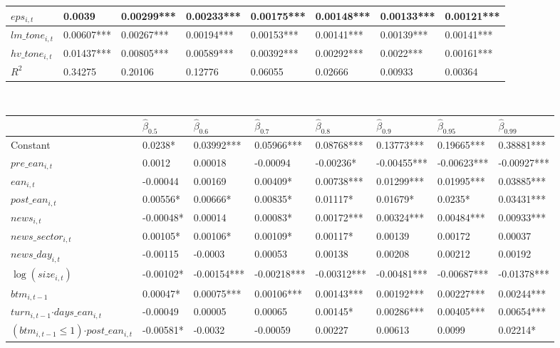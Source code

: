 \documentclass[]{article}
\begin{document}
\begin{small}
\begin{table}
\begin{tabular}[t]{l|l|l|l|l|l|l|l}
\hline
$eps_{i,t}$ & 0.0039 & 0.00299*** & 0.00233*** & 0.00175*** & 0.00148*** & 0.00133*** & 0.00121***\\
\hline
$lm\_tone_{i,t}$ & 0.00607*** & 0.00267*** & 0.00194*** & 0.00153*** & 0.00141*** & 0.00139*** & 0.00141***\\
\hline
$hv\_tone_{i,t}$  & 0.01437*** & 0.00805*** & 0.00589*** & 0.00392*** & 0.00292*** & 0.0022*** & 0.00161***\\
\hline
$R^2$ & 0.34275 & 0.20106 & 0.12776 & 0.06055 & 0.02666 & 0.00933 & 0.00364\\
\hline
\end{tabular}
\\
\centering
\begin{tabular}[t]{l|l|l|l|l|l|l|l}
\hline
  & $\hat\beta_{0.5}$ & $\hat\beta_{0.6}$ & $\hat\beta_{0.7}$ & $\hat\beta_{0.8}$ & $\hat\beta_{0.9}$ & $\hat\beta_{0.95}$ & $\hat\beta_{0.99}$\\
\hline
Constant & 0.0238* & 0.03992*** & 0.05966*** & 0.08768*** & 0.13773*** & 0.19665*** & 0.38881***\\
\hline
$pre\_ean_{i,t}$ & 0.0012 & 0.00018 & -0.00094 & -0.00236* & -0.00455*** & -0.00623*** & -0.00927***\\
\hline
$ean_{i,t}$ & -0.00044 & 0.00169 & 0.00409* & 0.00738*** & 0.01299*** & 0.01995*** & 0.03885***\\
\hline
$post\_ean_{i,t}$ & 0.00556* & 0.00666* & 0.00835* & 0.01117* & 0.01679* & 0.0235* & 0.03431***\\
\hline
$news_{i,t}$ & -0.00048* & 0.00014 & 0.00083* & 0.00172*** & 0.00324*** & 0.00484*** & 0.00933***\\
\hline
$news\_sector_{i,t}$ & 0.00105* & 0.00106* & 0.00109* & 0.00117* & 0.00139 & 0.00172 & 0.00037\\
\hline
$news\_day_{i,t}$ & -0.00115 & -0.0003 & 0.00053 & 0.00138 & 0.00208 & 0.00212 & 0.00192\\
\hline
$\log(size_{i,t})$& -0.00102* & -0.00154*** & -0.00218*** & -0.00312*** & -0.00481*** & -0.00687*** & -0.01378***\\
\hline
$btm_{i,t-1}$ & 0.00047* & 0.00075*** & 0.00106*** & 0.00143*** & 0.00192*** & 0.00227*** & 0.00244***\\
\hline
$turn_{i,t-1}$$\cdot days\_ean_{i,t}$ & -0.00049 & 0.00005 & 0.00065 & 0.00145* & 0.00286*** & 0.00405*** & 0.00654***\\
\hline
$(btm_{i,t-1}\leq 1)$$\cdot post\_ean_{i,t}$ & -0.00581* & -0.0032 & -0.00059 & 0.00227 & 0.00613 & 0.0099 & 0.02214*\\

\end{tabular}
\end{table}
\end{small}
\end{document}
